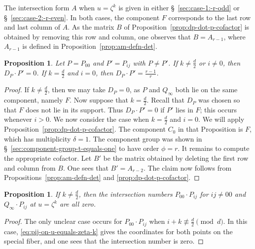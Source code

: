 \documentclass[reqno]{amsart}
\newtheorem{proposition}[thm]{Proposition}
\theoremstyle{definition}
\theoremstyle{remark}
\begin{document}
The intersection form $A$ when $u = \zeta^k$ is given in either \S~\ref{sec:case-1:-r-odd} or \S~\ref{sec:case-2:-r-even}. In both cases, the component $F$ corresponds to the last row and last column of $A$. As the matrix $B$ of Proposition~\ref{prop:dp-dot-p-cofactor} is obtained by removing this row and column, one observes that $B = A_{r-1}$, where $A_{r-1}$ is defined in Proposition~\ref{prop:am-defn-det}.

\begin{proposition}\label{prop:dp-u-zeta-k}
  Let $P = P_{00}$ and $P' = P_{ij}$ with $P \neq P'$. If $k \neq \frac{d}{2}$ or $i \neq 0$, then $D_P \cdot P' = 0$. If $k = \frac{d}{2}$ and $i = 0$, then $D_P \cdot P' = \frac{r-1}{r}$.
\end{proposition}

\begin{proof}
  If $k \neq \frac{d}{2}$, then we may take $D_P = 0$, as $P$ and $Q_\infty$ both lie on the same component, namely $F$. Now suppose that $k = \frac{d}{2}$. Recall that $D_P$ was chosen so that $F$ does not lie in its support. Thus $D_P \cdot P' = 0$ if $P'$ lies in $F$; this occurs whenever $i > 0$. We now consider the case when $k = \frac{d}{2}$ and $i = 0$. We will apply Proposition~\ref{prop:dp-dot-p-cofactor}. The component $C_0$ in that Proposition is $F$, which has multiplicity $\delta = 1$. The component group was shown in \S~\ref{sec:component-group-t-equals-one} to have order $\phi = r$. It remains to compute the appropriate cofactor. Let $B'$ be the matrix obtained by deleting the first row and column from $B$. One sees that $B' = A_{r-2}$. The claim now follows from Propositions~\ref{prop:am-defn-det} and \ref{prop:dp-dot-p-cofactor}.
\end{proof}

\begin{proposition}\label{prop:local-intersections-u-zeta-k}
  If $k \neq \frac{d}{2}$, then the intersection numbers $P_{00} \cdot P_{ij}$ for $ij \neq 00$ and $Q_{\infty} \cdot P_{ij}$ at $u = \zeta^k$ are all zero.
\end{proposition} 

\begin{proof}
  The only unclear case occurs for $P_{00} \cdot P_{ij}$ when $i + k \not\equiv \frac{d}{2} \pmod{d}$. In this case, \eqref{eq:pij-on-u-equals-zeta-k} gives the coordinates for both points on the special fiber, and one sees that the intersection number is zero.
\end{proof}
\end{document}
